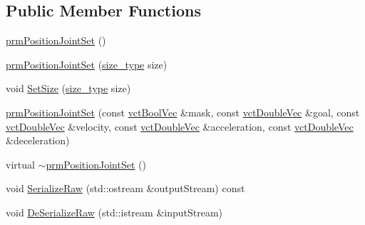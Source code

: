 \subsection*{Public Member Functions}
\begin{DoxyCompactItemize}
\item 
\hyperlink{classprm_position_joint_set_a5ba3988fc2cda63a186196b023b87d95}{prm\-Position\-Joint\-Set} ()
\item 
\hyperlink{classprm_position_joint_set_a49edcaad1c444e73dd95e434a5eae2a6}{prm\-Position\-Joint\-Set} (\hyperlink{classprm_position_joint_set_a66e5a37bee0bb819b63270879d3ab08f}{size\-\_\-type} size)
\item 
void \hyperlink{classprm_position_joint_set_a213f2fdfe598daebe9601e6cd02c40b1}{Set\-Size} (\hyperlink{classprm_position_joint_set_a66e5a37bee0bb819b63270879d3ab08f}{size\-\_\-type} size)
\item 
\hyperlink{classprm_position_joint_set_a9a7d85174985ed253126a3850bf3a56d}{prm\-Position\-Joint\-Set} (const \hyperlink{vct_dynamic_vector_types_8h_aeb2237c134aee3769198bd9d55c8a9e0}{vct\-Bool\-Vec} \&mask, const \hyperlink{vct_dynamic_vector_types_8h_ade4b3068c86fb88f41af2e5187e491c2}{vct\-Double\-Vec} \&goal, const \hyperlink{vct_dynamic_vector_types_8h_ade4b3068c86fb88f41af2e5187e491c2}{vct\-Double\-Vec} \&velocity, const \hyperlink{vct_dynamic_vector_types_8h_ade4b3068c86fb88f41af2e5187e491c2}{vct\-Double\-Vec} \&acceleration, const \hyperlink{vct_dynamic_vector_types_8h_ade4b3068c86fb88f41af2e5187e491c2}{vct\-Double\-Vec} \&deceleration)
\item 
virtual \hyperlink{classprm_position_joint_set_a5de7dbbd11b53a1578ba4b1a83f1f20b}{$\sim$prm\-Position\-Joint\-Set} ()
\item 
void \hyperlink{classprm_position_joint_set_a8278a4ae753257ef0f23ec502c1d8f11}{Serialize\-Raw} (std\-::ostream \&output\-Stream) const 
\item 
void \hyperlink{classprm_position_joint_set_ab9dbbdba641c2bbd31255a4acb991674}{De\-Serialize\-Raw} (std\-::istream \&input\-Stream)
\end{DoxyCompactItemize}
